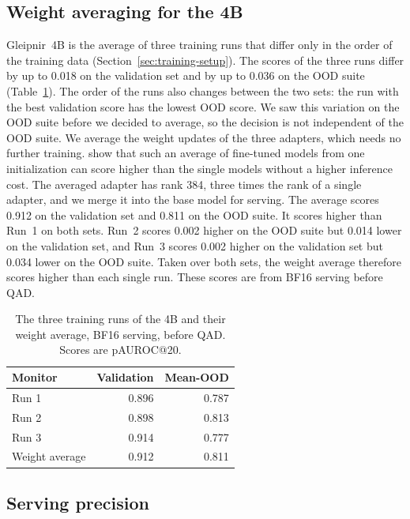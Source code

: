\subsection{Weight averaging for the 4B}
\label{app:ablation-average}

Gleipnir~4B is the average of three training runs that differ only in the order of the training data (Section~\ref{sec:training-setup}).
The scores of the three runs differ by up to 0.018 on the validation set and by up to 0.036 on the OOD suite (Table~\ref{tab:average}).
The order of the runs also changes between the two sets: the run with the best validation score has the lowest OOD score.
We saw this variation on the OOD suite before we decided to average, so the decision is not independent of the OOD suite.
We average the weight updates of the three adapters, which needs no further training.
\citet{wortsman2022soups} show that such an average of fine-tuned models from one initialization can score higher than the single models without a higher inference cost.
The averaged adapter has rank 384, three times the rank of a single adapter, and we merge it into the base model for serving.
The average scores 0.912 on the validation set and 0.811 on the OOD suite.
It scores higher than Run~1 on both sets.
Run~2 scores 0.002 higher on the OOD suite but 0.014 lower on the validation set, and Run~3 scores 0.002 higher on the validation set but 0.034 lower on the OOD suite.
Taken over both sets, the weight average therefore scores higher than each single run.
These scores are from BF16 serving before QAD.

\begin{table}[h]
\caption{The three training runs of the 4B and their weight average, BF16 serving, before QAD. Scores are pAUROC@20.}
\label{tab:average}
\centering
\small
\begin{tabular}{@{}lrr@{}}
\toprule
Monitor & Validation & Mean-OOD \\
\midrule
Run 1 & 0.896 & 0.787 \\
Run 2 & 0.898 & 0.813 \\
Run 3 & 0.914 & 0.777 \\
\midrule
Weight average & 0.912 & 0.811 \\
\bottomrule
\end{tabular}
\end{table}

\subsection{Serving precision}
\label{app:ablation-precision}

